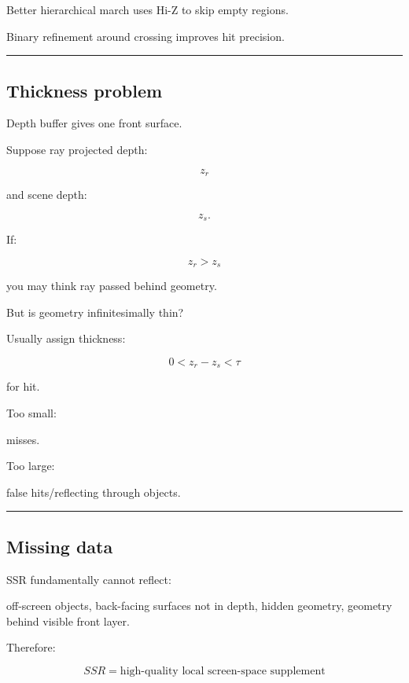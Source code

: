 Better hierarchical march uses Hi-Z to skip empty regions.

Binary refinement around crossing improves hit precision.

\begin{center}\rule{0.5\linewidth}{0.5pt}\end{center}

\subsection{Thickness problem}\label{04-visual-computing-ii-ch040-thickness-problem}

\hypertarget{04-visual-computing-ii-ch040-thickness-problem}{}

Depth buffer gives one front surface.

Suppose ray projected depth:

\[
z_r
\]

and scene depth:

\[
z_s.
\]

If:

\[
z_r>z_s
\]

you may think ray passed behind geometry.

But is geometry infinitesimally thin?

Usually assign thickness:

\[
0<
z_r-z_s
<
\tau
\]

for hit.

Too small:

misses.

Too large:

false hits/reflecting through objects.

\begin{center}\rule{0.5\linewidth}{0.5pt}\end{center}

\subsection{Missing data}\label{04-visual-computing-ii-ch040-missing-data}

\hypertarget{04-visual-computing-ii-ch040-missing-data}{}

SSR fundamentally cannot reflect:

off-screen objects, back-facing surfaces not in depth, hidden geometry, geometry behind visible front layer.

Therefore:

\[
\boxed{
SSR
=
\text{high-quality local screen-space supplement}
}
\]

